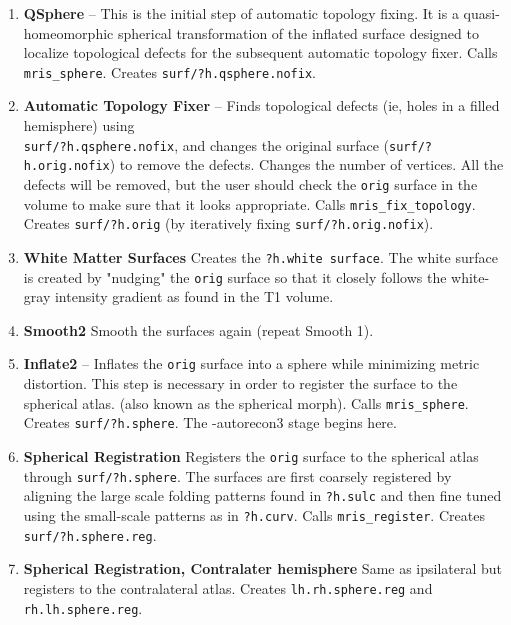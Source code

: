 \documentclass[paper=a4, fontsize=11pt]{scrartcl} %
\numberwithin{equation}{section} %
\numberwithin{figure}{section} %
\numberwithin{table}{section} %
\begin{document}
\begin{enumerate}
    \item \textbf{QSphere} -- This is the initial step of automatic topology fixing. It is a quasi-homeomorphic spherical transformation of the inflated surface designed to localize topological defects for the subsequent automatic topology fixer. Calls \texttt{mris\_sphere}. Creates \texttt{surf/?h.qsphere.nofix}.
    
    \item \textbf{Automatic Topology Fixer} -- Finds topological defects (ie, holes in a filled hemisphere) using \\ \texttt{surf/?h.qsphere.nofix}, and changes the original surface (\texttt{surf/?h.orig.nofix}) to remove the defects. Changes the number of vertices. All the defects will be removed, but the user should check the \texttt{orig} surface in the volume to make sure that it looks appropriate. Calls \texttt{mris\_fix\_topology}. Creates \texttt{surf/?h.orig} (by iteratively fixing \texttt{surf/?h.orig.nofix}).
    
    \item \textbf{White Matter Surfaces} Creates the \texttt{?h.white surface}. The white surface is created by "nudging" the \texttt{orig} surface so that it closely follows the white-gray intensity gradient as found in the T1 volume.
    
    \item \textbf{Smooth2} Smooth the surfaces again (repeat Smooth 1).

    \item \textbf{Inflate2} -- Inflates the \texttt{orig} surface into a sphere while minimizing metric distortion. This step is necessary in order to register the surface to the spherical atlas. (also known as the spherical morph). Calls \texttt{mris\_sphere}. Creates \texttt{surf/?h.sphere}. The -autorecon3 stage begins here.
   
    \item \textbf{Spherical Registration } Registers the \texttt{orig} surface to the spherical atlas through \texttt{surf/?h.sphere}. The surfaces are first coarsely registered by aligning the large scale folding patterns found in \texttt{?h.sulc} and then fine tuned using the small-scale patterns as in \texttt{?h.curv}. Calls \texttt{mris\_register}. Creates \texttt{surf/?h.sphere.reg}.
    
    \item \textbf{Spherical Registration, Contralater hemisphere} Same as ipsilateral but registers to the contralateral atlas. Creates \texttt{lh.rh.sphere.reg} and \texttt{rh.lh.sphere.reg}.


\end{enumerate}
\end{document}

